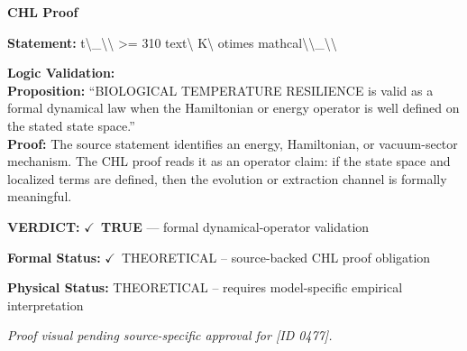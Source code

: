 \vspace{0.45em}
\noindent\textbf{CHL Proof}\par
\textbf{Statement:} t\textbackslash{}\_\textbackslash{}\textbackslash{} >= 310 text\textbackslash{} K\textbackslash{} otimes mathcal\textbackslash{}\textbackslash{}\_\textbackslash{}\textbackslash{}

\textbf{Logic Validation:}\\
\textbf{Proposition:} ``BIOLOGICAL TEMPERATURE RESILIENCE is valid as a formal dynamical law when the
Hamiltonian or energy operator is well defined on the stated state space.''\\
\textbf{Proof:} The source statement identifies an energy, Hamiltonian, or vacuum-sector mechanism. The
CHL proof reads it as an operator claim: if the state space and localized terms are
defined, then the evolution or extraction channel is formally meaningful.

\textbf{VERDICT:} \ensuremath{\checkmark}\ \textbf{TRUE} --- formal dynamical-operator validation

\textbf{Formal Status:} \ensuremath{\checkmark}\ THEORETICAL -- source-backed CHL proof obligation

\textbf{Physical Status:} THEORETICAL -- requires model-specific empirical interpretation
\par\vspace{0.45em}
\par
\vfill
\begingroup\footnotesize\itshape
Proof visual pending source-specific approval for [ID 0477].
\par\endgroup
\vfill
\endgroup
\endgroup
